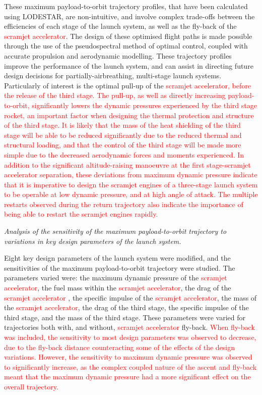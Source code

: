 	These maximum payload-to-orbit trajectory profiles, that have been calculated using LODESTAR, are non-intuitive, and involve complex trade-offs between the efficiencies of each stage of the launch system, as well as the fly-back of the \textcolor{red}{scramjet accelerator}. The design of these optimised flight paths is made possible through the use of the pseudospectral method of optimal control, coupled with accurate propulsion and aerodynamic modelling.  
	These trajectory profiles improve the performance of the launch system, and can assist in directing future design decisions for partially-airbreathing, multi-stage launch systems. Particularly of interest is the optimal pull-up of the \textcolor{red}{scramjet accelerator, before the release of the third stage. 
	The pull-up, as well as directly increasing payload-to-orbit, significantly lowers the dynamic pressures experienced by the third stage rocket, an important factor when designing the thermal protection and structure of the third stage. It is likely that the mass of the heat shielding of the third stage will be able to be reduced significantly due to the reduced thermal and structural loading, and that the control of the third stage will be made more simple due to the decreased aerodynamic forces and moments experienced.
	In addition to the significant altitude-raising manoeuvre at the first stage-scramjet accelerator separation, these deviations from maximum dynamic pressure indicate that it is imperative to design the scramjet engines of a three-stage launch system to be operable at low dynamic pressure, and at high angle of attack. The multiple restarts observed during the return trajectory also indicate the importance of being able to restart the scramjet engines rapidly. }
	
	
	
	\vspace{10pt}
	\emph{Analysis of the sensitivity of the maximum payload-to-orbit trajectory to variations in key design parameters of the launch system.}
	
Eight key design parameters of the launch system were modified, and the sensitivities of the maximum payload-to-orbit trajectory were studied.
The parameters varied were: the maximum dynamic pressure of the \textcolor{red}{scramjet accelerator}, the fuel mass within the \textcolor{red}{scramjet accelerator}, the drag of the \textcolor{red}{scramjet accelerator} , the specific impulse of the \textcolor{red}{scramjet accelerator}, the mass of the \textcolor{red}{scramjet accelerator}, the drag of the third stage, the specific impulse of the third stage, and the mass of the third stage. 
These parameters were varied for trajectories both with, and without, \textcolor{red}{scramjet accelerator} fly-back. 
\textcolor{red}{
 When fly-back was included, the sensitivity to most design parameters was observed to decrease, due to the fly-back distance counteracting some of the effects of the design variations. However, the sensitivity to maximum dynamic pressure was observed to significantly increase, as the complex coupled nature of the ascent and fly-back meant that the maximum dynamic pressure had a more significant effect on the overall trajectory.} 

